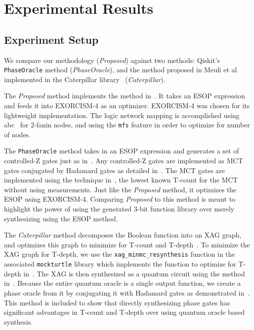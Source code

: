 \section{Experimental Results}
\label{Exp}
\subsection{Experiment Setup}
\label{Exp:Set}
We compare our methodology ({\it Proposed}) against two methods: Qiskit's \texttt{PhaseOracle} method
({\it PhaseOracle}), and the method proposed in Meuli et al~\cite{bib-meuli-esop} implemented in the
Caterpillar library~\cite{bib-meuli-ros} ({\it Caterpillar}).

The {\it Proposed} method implements the method in~. It takes an ESOP expression and
feeds it into EXORCISM-4 as an optimizer. EXORCISM-4 was chosen for its lightweight implementation.
The logic network mapping is accomplished using abc~\cite{bib-mishchenko-lut} for 2-fanin nodes,
and using the \texttt{mfs} feature in order to optimize for number of nodes.

The \texttt{PhaseOracle} method takes in an ESOP expression and generates a set of controlled-Z gates
just as in~. Any controlled-Z gates are implemented as MCT gates conjugated by
Hadamard gates as detailed in~. The MCT gates are implemented using the technique
in~\cite{bib-rtof-maslov}, the lowest known T-count for the MCT without using measurements. Just like the
{\it Proposed} method, it optimizes the ESOP using EXORCISM-4.
Comparing {\it Proposed} to this method is meant to highlight the power of using the generated
3-bit function library over merely synthesizing using the ESOP method.

The {\it Caterpillar} method decomposes the Boolean function into an XAG graph, and optimizes
this graph to minimize for T-count and T-depth~\cite{bib-meuli-esop,bib-meuli-xag,bib-meuli-ros,bib-meuli-mult}.
To minimize the XAG graph for T-depth, we use the \texttt{xag\_minmc\_resynthesis} function in the
associated \texttt{mockturtle} library which implements the function to optimize for
T-depth in~\cite{bib-meuli-mult}. The XAG is then synthesized as a quantum circuit using the method
in~\cite{bib-meuli-mult}. Because the entire quantum oracle is a single output function, we create a phase
oracle from it by conjugating it with Hadamard gates as demonstrated in~. This method
is included to show that directly synthesizing phase gates has significant advantages in T-count and
T-depth over using quantum oracle based synthesis.

